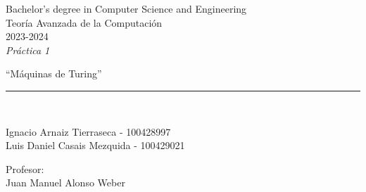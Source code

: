 \def\degree{Bachelor's degree in Computer Science and Engineering}
\def\subject{Teoría Avanzada de la Computación}
\def\year{2023-2024}
\def\labType{Práctica 1}
\def\labName{Máquinas de Turing}
\def\proffesor{Juan Manuel Alonso Weber}

\begin{titlepage}
	\begin{sffamily}
	\color{azulUC3M}
	\begin{center}

		\begin{figure}[H]
		\end{figure}
		\vspace{1.5cm}

		\begin{Large}
			\degree\\
            \subject\\
			\year\\
			\vspace{2cm}		
			\textsl{\labType}
			\bigskip
			
		\end{Large}

		{\Huge ``\labName''}\\

		\vspace*{0.5cm}
		\rule{10.5cm}{0.1mm}\\
		\vspace*{0.9cm}
		
 		{\LARGE Ignacio Arnaiz Tierraseca - 100428997}\\
 		\vspace*{0.2cm}
 		{\LARGE Luis Daniel Casais Mezquida - 100429021}\\
 		\vspace*{0.2cm}
		
		\vspace*{0.8cm}
		
		\begin{Large}
		    Profesor:\\
			\proffesor\\
		\end{Large}

	\end{center}
	\vfill
	\end{sffamily}
\end{titlepage}